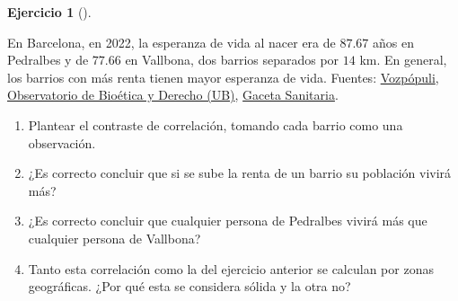 \documentclass[
  spanish,
  a4paper,
]{scrreport}
\theoremstyle{definition}
\newtheorem{exercise}{Ejercicio}[chapter]
\theoremstyle{remark}
\begin{document}
\begin{exercise}[]\protect\hypertarget{exr-interpretacion-renta-esperanza-vida}{}\label{exr-interpretacion-renta-esperanza-vida}

En Barcelona, en 2022, la esperanza de vida al nacer era de \(87.67\)
años en Pedralbes y de \(77.66\) en Vallbona, dos barrios separados por
\(14\) km. En general, los barrios con más renta tienen mayor esperanza
de vida. Fuentes:
\href{https://www.vozpopuli.com/bienestar/estos-son-los-barrios-de-barcelona-donde-hay-mas-esperanza-de-vida-segun-los-cientificos.html}{Vozpópuli},
\href{https://www.bioeticayderecho.ub.edu/en/node/7425}{Observatorio de
Bioética y Derecho (UB)},
\href{https://doaj.org/article/f0bcbb7f722549a8a5ad0738fcc65de0}{Gaceta
Sanitaria}.

\begin{enumerate}
\def\labelenumi{\alph{enumi}.}
\item
  Plantear el contraste de correlación, tomando cada barrio como una
  observación.
\item
  ¿Es correcto concluir que si se sube la renta de un barrio su
  población vivirá más?
\item
  ¿Es correcto concluir que cualquier persona de Pedralbes vivirá más
  que cualquier persona de Vallbona?
\item
  Tanto esta correlación como la del ejercicio anterior se calculan por
  zonas geográficas. ¿Por qué esta se considera sólida y la otra no?
\end{enumerate}

\end{exercise}
\end{document}
